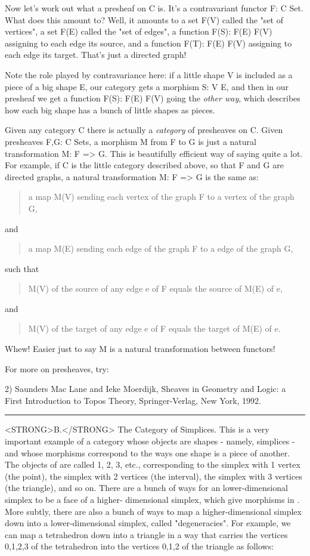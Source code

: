 Now let's work out what a presheaf on C is.  It's a contravariant
functor F: C \to  Set.  What does this amount to?   Well, it amounts
to a set F(V) called the "set of vertices", a set F(E) called the
"set of edges", a function F(S): F(E) \to  F(V) assigning to each edge
its source, and a function F(T): F(E) \to  F(V) assigning to each edge
its target.  That's just a directed graph!  

Note the role played by contravariance here: if a little shape V is
included as a piece of a big shape E, our category gets a morphism 
S: V \to  E, and then in our presheaf we get a function F(S): F(E) \to  F(V)
going the \emph{other way}, which describes how each big shape has a bunch of
little shapes as pieces.

Given any category C there is actually a \emph{category} of presheaves on C.
Given presheaves F,G: C \to  Sets, a morphism M from F to G is just a
natural transformation M: F => G.  This is beautifully efficient way of
saying quite a lot.  For example, if C is the little category described
above, so that F and G are directed graphs, a natural transformation 
M: F => G is the same as:
\begin{quote}
    a map M(V) sending each vertex of the graph F to a vertex of the
    graph G,
\end{quote}
and 
\begin{quote}
    a map M(E) sending each edge of the graph F to a edge of the 
    graph G,
\end{quote}
such that
\begin{quote}
    M(V) of the source of any edge e of F equals the source of 
    M(E) of e,
\end{quote}
and
\begin{quote}
    M(V) of the target of any edge e of F equals the target of 
    M(E) of e.
\end{quote}
Whew!  Easier just to say M is a natural transformation between
functors!  

For more on presheaves, try:

2) Saunders Mac Lane and Ieke Moerdijk, Sheaves in Geometry and Logic: 
a First Introduction to Topos Theory, Springer-Verlag, New York, 1992.
\par\noindent\rule{\textwidth}{0.4pt}
<STRONG>B.</STRONG>  The Category of Simplices.  This is a very important example
of a category whose objects are shapes - namely, simplices - and
whose morphisms correspond to the ways one shape is a piece of another.
The objects of \Delta  are called 1, 2, 3, etc., corresponding to the
simplex with 1 vertex (the point), the simplex with 2 vertices (the
interval), the simplex with 3 vertices (the triangle), and so on.  There
are a bunch of ways for an lower-dimensional simplex to be a face of a
higher- dimensional simplex, which give morphisms in \Delta .  More
subtly, there are also a bunch of ways to map a higher-dimensional
simplex down into a lower-dimensional simplex, called "degeneracies".
For example, we can map a tetrahedron down into a triangle in a way that
carries the vertices {0,1,2,3} of the tetrahedron into the vertices
{0,1,2} of the triangle as follows:

